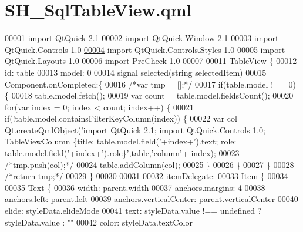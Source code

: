 \hypertarget{SH__SqlTableView_8qml}{\section{S\-H\-\_\-\-Sql\-Table\-View.\-qml}
\label{SH__SqlTableView_8qml}
}

\begin{DoxyCode}
00001 \textcolor{keyword}{import} QtQuick 2.1
00002 import QtQuick.Window 2.1
00003 import QtQuick.Controls 1.0
\hypertarget{SH__SqlTableView_8qml_source_l00004}{}\hyperlink{classSH__SqlTableView}{00004} import QtQuick.Controls.Styles 1.0
00005 import QtQuick.Layouts 1.0
00006 import PreCheck 1.0
00007 
00011 TableView \{
00012     \textcolor{keywordtype}{id}: table
00013     model: 0
00014     signal selected(\textcolor{keywordtype}{string} selectedItem)
00015     Component.onCompleted:\{
00016         \textcolor{comment}{/*var tmp = [];*/}
00017         \textcolor{keywordflow}{if}(table.model !== 0) \{
00018             table.model.fetch();
00019             var count = table.model.fieldsCount();
00020             \textcolor{keywordflow}{for}(var index = 0; index < count; index++) \{
00021                 \textcolor{keywordflow}{if}(!table.model.containsFilterKeyColumn(index)) \{
00022                     var col = Qt.createQmlObject(\textcolor{stringliteral}{'import QtQuick 2.1; import QtQuick.Controls 1.0;
       TableViewColumn \{title: table.model.field('}+index+\textcolor{stringliteral}{').text; role: table.model.field('}+index+\textcolor{stringliteral}{').role\}'},table,\textcolor{stringliteral}{'column'}+
      index);
00023                     \textcolor{comment}{/*tmp.push(col);*/}
00024                     table.addColumn(col);
00025                 \}
00026             \}
00027         \}
00028         \textcolor{comment}{/*return tmp;*/}
00029     \}
00030 
00031 
00032     itemDelegate:
00033         \hyperlink{classItem}{Item} \{
00034 
00035         Text \{
00036             width: parent.width
00037             anchors.margins: 4
00038             anchors.left: parent.left
00039             anchors.verticalCenter: parent.verticalCenter
00040             elide: styleData.elideMode
00041             text: styleData.value !== undefined ? styleData.value : \textcolor{stringliteral}{""}
00042             color: styleData.textColor

\end{DoxyCode}
